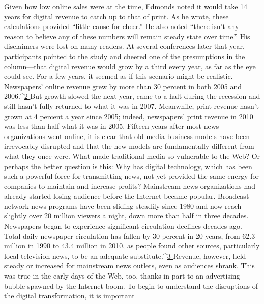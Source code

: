
Given how low online sales were at the time, Edmonds noted it would take 14
years for digital revenue to catch up to that of print. As he wrote, these calculations
provided ``little cause for cheer.'' He also noted ``there isn’t any reason to
believe any of these numbers will remain steady state over time.''
His disclaimers were lost on many readers. At several conferences later that
year, participants pointed to the study and cheered one of the presumptions in
the column—that digital revenue would grow by a third every year, as far as the
eye could see.
For a few years, it seemed as if this scenario might be realistic. Newspapers’
online revenue grew by more than 30 percent in both 2005 and 2006.^{\href{#endnotes-ch1}{2 }}But
growth slowed the next year, came to a halt during the recession and still hasn’t
fully returned to what it was in 2007. Meanwhile, print revenue hasn’t grown at
4 percent a year since 2005; indeed, newspapers’ print revenue in 2010 was less
than half what it was in 2005.
Fifteen years after most news organizations went online, it is clear that old media
business models have been irrevocably disrupted and that the new models are
fundamentally different from what they once were. What made traditional media
so vulnerable to the Web? Or perhaps the better question is this: Why has digital
technology, which has been such a powerful force for transmitting news, not yet
provided the same energy for companies to maintain and increase profits?
Mainstream news organizations had already started losing audience before
the Internet became popular. Broadcast network news programs have been
sliding steadily since 1980 and now reach slightly over 20 million viewers a
night, down more than half in three decades. Newspapers began to experience
significant circulation declines decades ago. Total daily newspaper circulation
has fallen by 30 percent in 20 years, from 62.3 million in 1990 to 43.4 million
in 2010, as people found other sources, particularly local television news, to be
an adequate substitute.^{\href{#endnotes-ch1}{3 }}Revenue, however, held steady or increased for mainstream news outlets, even
as audiences shrank. This was true in the early days of the Web, too, thanks in part
to an advertising bubble spawned by the Internet boom.
To begin to understand the disruptions of the digital transformation, it is important
